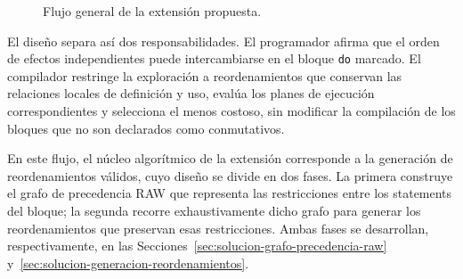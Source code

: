 \begin{figure}[ht]
\centering
\vspace{0.3cm}
\captionsetup{skip=15pt}
\caption{Flujo general de la extensión propuesta.}
\label{fig:solucion-pipeline-conceptual}
\end{figure}

El diseño separa así dos responsabilidades. El programador afirma que el orden de efectos independientes puede intercambiarse en el bloque \texttt{do} marcado. El compilador restringe la exploración a reordenamientos que conservan las relaciones locales de definición y uso, evalúa los planes de ejecución correspondientes y selecciona el menos costoso, sin modificar la compilación de los bloques que no son declarados como conmutativos.

En este flujo, el núcleo algorítmico de la extensión corresponde a la generación de reordenamientos válidos, cuyo diseño se divide en dos fases. La primera construye el grafo de precedencia RAW que representa las restricciones entre los statements del bloque; la segunda recorre exhaustivamente dicho grafo para generar los reordenamientos que preservan esas restricciones. Ambas fases se desarrollan, respectivamente, en las Secciones~\ref{sec:solucion-grafo-precedencia-raw} y~\ref{sec:solucion-generacion-reordenamientos}.
